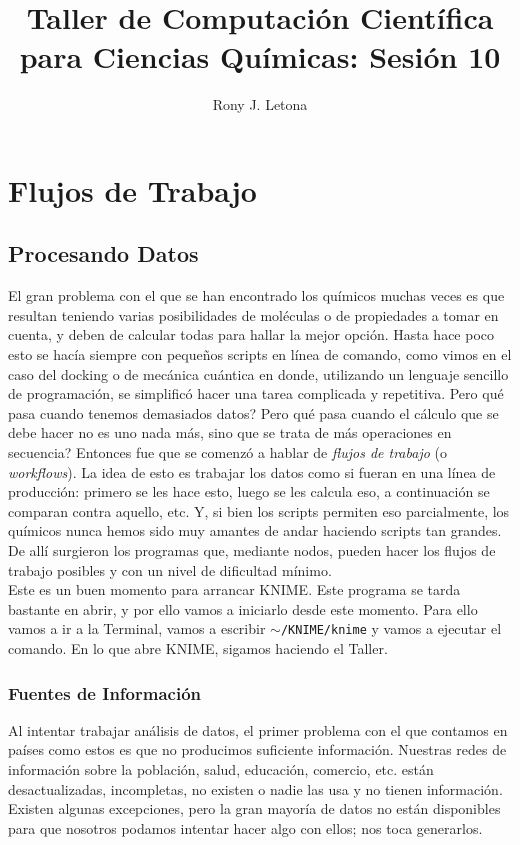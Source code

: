 \documentclass[10pt,letterpaper]{article}
\author{Rony J. Letona}
\title{Taller de Computaci\'on Cient\'ifica para Ciencias Qu\'imicas: Sesi\'on 10}
\newcommand{\inlinecode}[1]{
\colorbox{light-gray}{\texttt{#1}}
}
\begin{document}
\maketitle

\section{Flujos de Trabajo}


\subsection{Procesando Datos}
El gran problema con el que se han encontrado los qu\'imicos muchas veces es que resultan teniendo varias posibilidades de mol\'eculas o de propiedades a tomar en cuenta, y deben de calcular todas para hallar la mejor opci\'on. Hasta hace poco esto se hac\'ia siempre con peque\~nos scripts en l\'inea de comando, como vimos en el caso del docking o de mec\'anica cu\'antica en donde, utilizando un lenguaje sencillo de programaci\'on, se simplific\'o hacer una tarea complicada y repetitiva. Pero qu\'e pasa cuando tenemos demasiados datos? Pero qu\'e pasa cuando el c\'alculo que se debe hacer no es uno nada m\'as, sino que se trata de m\'as operaciones en secuencia? Entonces fue que se comenz\'o a hablar de \emph{flujos de trabajo} (o \emph{workflows}). La idea de esto es trabajar los datos como si fueran en una l\'inea de producci\'on: primero se les hace esto, luego se les calcula eso, a continuaci\'on se comparan contra aquello, etc. Y, si bien los scripts permiten eso parcialmente, los qu\'imicos nunca hemos sido muy amantes de andar haciendo scripts tan grandes. De all\'i surgieron los programas que, mediante nodos, pueden hacer los flujos de trabajo posibles y con un nivel de dificultad m\'inimo.\\

Este es un buen momento para arrancar KNIME. Este programa se tarda bastante en abrir, y por ello vamos a iniciarlo desde este momento. Para ello vamos a ir a la Terminal, vamos a escribir \inlinecode{$\sim$/KNIME/knime} y vamos a ejecutar el comando. En lo que abre KNIME, sigamos haciendo el Taller.

\subsubsection{Fuentes de Informaci\'on}
Al intentar trabajar an\'alisis de datos, el primer problema con el que contamos en pa\'ises como estos es que no producimos suficiente informaci\'on. Nuestras redes de informaci\'on sobre la poblaci\'on, salud, educaci\'on, comercio, etc. est\'an desactualizadas, incompletas, no existen o nadie las usa y no tienen informaci\'on. Existen algunas excepciones, pero la gran mayor\'ia de datos no est\'an disponibles para que nosotros podamos intentar hacer algo con ellos; nos toca generarlos.\\
\end{document}
